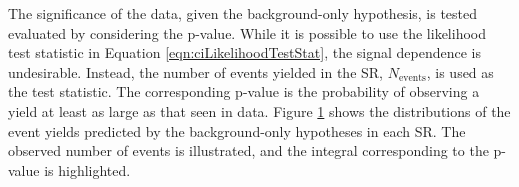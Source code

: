 \begin{figure}[h!]
\captionsetup[subfigure]{position=b}
\centering
{}
\caption{}
\label{fig:ciSignificance}
\end{figure}

The significance of the data, given the background-only hypothesis, is tested evaluated by considering the p-value.
While it is possible to use the likelihood test statistic in Equation \ref{eqn:ciLikelihoodTestStat}, the signal dependence is undesirable.
Instead, the number of events yielded in the SR, $N_\text{events}$, is used as the test statistic.
The corresponding p-value is the probability of observing a yield at least as large as that seen in data.
Figure \ref{fig:ciSignificance} shows the distributions of the event yields predicted by the background-only hypotheses in each SR.
The observed number of events is illustrated, and the integral corresponding to the p-value is highlighted.

